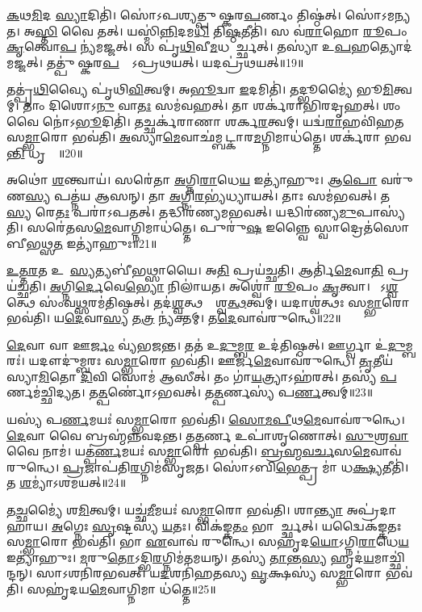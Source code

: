 \ul{𑌕}𑌥\ul{𑌮𑌿}𑌦 \ul{𑌸𑍍𑌯𑌾}𑌦𑌿𑌤𑌿॑।
𑌸𑍋॑𑌽𑌪𑌶𑍍𑌯𑌤𑍍𑌪𑍁𑌷𑍍𑌕𑌰\ul{𑌪}𑌰𑍍𑌣𑌂 𑌤𑌿𑌷𑍍𑌠॑𑌤𑍍।
𑌸𑍋॑𑌽𑌮𑌨𑍍𑌯𑌤।
𑌅\ul{𑌸𑍍𑌤𑌿} 𑌵𑍈 𑌤𑌤𑍍।
𑌯𑌸𑍍𑌮𑌿॑\ul{𑌨𑍍𑌨𑌿}𑌦𑌮\ul{𑌧𑌿} 𑌤𑌿\ul{𑌷𑍍𑌠}𑌤𑍀𑌤𑌿॑।
𑌸 𑌵॑\ul{𑌰𑌾}𑌹𑍋 \ul{𑌰𑍂}𑌪𑌂 \ul{𑌕𑍃}𑌤𑍍𑌵𑍋\ul{𑌪} 𑌨𑍍𑌯॑𑌮𑌜𑍍𑌜𑌤𑍍।
𑌸 𑌪𑍃॑\ul{𑌥𑌿}𑌵𑍀\ul{𑌮}𑌧 𑌆᳚𑌰𑍍𑌚𑍍𑌛𑌤𑍍।
𑌤𑌸𑍍𑌯𑌾॑ 𑌉\ul{𑌪}𑌹𑌤𑍍𑌯𑍋𑌦॑𑌮𑌜𑍍𑌜𑌤𑍍।
𑌤𑌤𑍍𑌪𑍁॑𑌷𑍍𑌕𑌰\ul{𑌪}𑌰𑍍𑌣𑍇᳚\-𑌽𑌪𑍍𑌰𑌥𑌯𑌤𑍍।
𑌯𑌦𑌪𑍍𑌰॑𑌥𑌯𑌤𑍍॥19॥

𑌤𑌤𑍍𑌪𑍃॑\ul{𑌥𑌿}𑌵𑍍𑌯𑍈 𑌪𑍃॑𑌥𑌿\ul{𑌵𑌿}𑌤𑍍𑌵𑌮𑍍।
𑌅\ul{𑌭𑍂}𑌦𑍍𑌵𑌾 \ul{𑌇}𑌦𑌮𑌿𑌤𑌿॑।
𑌤𑌦𑍍𑌭𑍂𑌮𑍍𑌯𑍈॑ 𑌭𑍂\ul{𑌮𑌿}𑌤𑍍𑌵𑌮𑍍।
𑌤𑌾𑌂 𑌦𑌿𑌶𑍋𑌽\ul{𑌨𑍁} 𑌵𑌾\ul{𑌤𑌃} 𑌸𑌮॑𑌵𑌹𑌤𑍍।
𑌤𑌾 𑌶𑌰𑍍𑌕॑𑌰𑌾𑌭𑌿𑌰𑌦𑍃𑌹𑌤𑍍।
𑌶𑌂 𑌵𑍈 𑌨𑍋॑𑌽\ul{𑌭𑍂}𑌦𑌿𑌤𑌿॑।
𑌤𑌚𑍍𑌛𑌰𑍍𑌕॑𑌰𑌾𑌣𑌾 𑌶𑌰𑍍𑌕\ul{𑌰}𑌤𑍍𑌵𑌮𑍍।
𑌯𑌦𑍍𑌵॑\ul{𑌰𑌾}𑌹𑌵𑌿॑𑌹𑌤 𑌸\ul{𑌮𑍍𑌭𑌾}𑌰𑍋 𑌭𑌵॑𑌤𑌿।
\ul{𑌅}𑌸𑍍𑌯𑌾\ul{𑌮𑍇}𑌵𑌾\-𑌛॑𑌮𑍍𑌬𑌟𑍍𑌕𑌾𑌰\ul{𑌮}𑌗𑍍𑌨𑌿𑌮𑌾𑌧॑𑌤𑍍𑌤𑍇।
𑌶𑌰𑍍𑌕॑𑌰𑌾 𑌭𑌵\ul{𑌨𑍍𑌤𑌿} 𑌧𑍃𑌤𑍍𑌯𑍈᳚॥20॥

𑌅𑌥𑍋॑ \ul{𑌶}𑌨𑍍𑌤𑍍𑌵𑌾𑌯॑।
𑌸𑌰𑍇॑𑌤𑌾 \ul{𑌅}𑌗𑍍𑌨𑌿\ul{𑌰𑌾}𑌧𑍇\ul{𑌯} 𑌇𑌤𑍍𑌯𑌾॑𑌹𑍁𑌃।
𑌆\ul{𑌪𑍋} 𑌵𑌰𑍁॑𑌣\ul{𑌸𑍍𑌯} 𑌪𑌤𑍍𑌨॑𑌯 𑌆𑌸𑌨𑍍।
𑌤𑌾 \ul{𑌅}𑌗𑍍𑌨𑌿\ul{𑌰}𑌭𑍍𑌯॑𑌧𑍍𑌯𑌾𑌯𑌤𑍍।
𑌤𑌾𑌃 𑌸𑌮॑𑌭𑌵𑌤𑍍।
𑌤\ul{𑌸𑍍𑌯} 𑌰𑍇\ul{𑌤𑌃} 𑌪𑌰𑌾॑𑌽𑌪𑌤𑌤𑍍।
𑌤𑌦𑍍𑌧𑌿𑌰॑𑌣𑍍𑌯𑌮𑌭𑌵𑌤𑍍।
𑌯𑌦𑍍𑌧𑌿𑌰॑𑌣𑍍𑌯\ul{𑌮𑍁}𑌪𑌾𑌸𑍍𑌯॑𑌤𑌿।
𑌸𑌰𑍇॑𑌤𑌸\ul{𑌮𑍇}𑌵𑌾𑌗𑍍𑌨𑌿𑌮𑌾𑌧॑𑌤𑍍𑌤𑍇।
𑌪𑍁𑌰𑍁॑\ul{𑌷} 𑌇𑌨𑍍𑌨𑍍𑌵𑍈 𑌸𑍍𑌵𑌾𑌦𑍍𑌰𑍇𑌤॑𑌸𑍋 𑌬𑍀𑌭𑌥𑍍𑌸\ul{𑌤} 𑌇𑌤𑍍𑌯𑌾॑𑌹𑍁𑌃॥21॥

\ul{𑌉}\ul{𑌤𑍍𑌤}\ul{𑌰}𑌤 𑌉𑌪𑌾᳚\ul{𑌸𑍍𑌯}𑌤𑍍𑌯𑌬𑍀॑𑌭𑌥𑍍𑌸𑌾𑌯𑍈।
𑌅\ul{𑌤𑌿} 𑌪𑍍𑌰𑌯॑𑌚𑍍𑌛𑌤𑌿।
𑌆𑌰𑍍𑌤𑌿॑\ul{𑌮𑍇}𑌵𑌾\ul{𑌤𑌿} 𑌪𑍍𑌰𑌯॑𑌚𑍍𑌛𑌤𑌿।
\ul{𑌅}𑌗𑍍𑌨𑌿\ul{𑌰𑍍𑌦𑍇}𑌵𑍇\ul{𑌭𑍍𑌯𑍋} 𑌨𑌿𑌲𑌾॑𑌯𑌤।
𑌅𑌶𑍍𑌵𑍋॑ \ul{𑌰𑍂}𑌪𑌂 \ul{𑌕𑍃}𑌤𑍍𑌵𑌾।
𑌸𑍋᳚𑌽\ul{𑌶𑍍𑌵}𑌤𑍍𑌥𑍇 𑌸𑌂॑𑌵\ul{𑌥𑍍𑌸}𑌰𑌮॑𑌤𑌿𑌷𑍍𑌠𑌤𑍍।
𑌤𑌦॑\ul{𑌶𑍍𑌵}𑌤𑍍𑌥𑌸𑍍𑌯𑌾᳚𑌶𑍍𑌵\ul{𑌤𑍍𑌥}𑌤𑍍𑌵𑌮𑍍।
𑌯𑌦𑌾𑌶𑍍𑌵॑𑌤𑍍𑌥𑌃 𑌸\ul{𑌮𑍍𑌭𑌾}𑌰𑍋 𑌭𑌵॑𑌤𑌿।
𑌯\ul{𑌦𑍇}𑌵𑌾\ul{𑌸𑍍𑌯} 𑌤\ul{𑌤𑍍𑌰} 𑌨𑍍𑌯॑𑌕𑍍𑌤𑌮𑍍।
𑌤\ul{𑌦𑍇}𑌵𑌾𑌵॑𑌰𑍁𑌨𑍍𑌧𑍇॥22॥

\ul{𑌦𑍇}𑌵𑌾 𑌵𑌾 𑌊\ul{𑌰𑍍𑌜𑌂} 𑌵𑍍𑌯॑𑌭𑌜𑌨𑍍𑌤।
𑌤𑌤॑ 𑌉\ul{𑌦𑍁}𑌮𑍍𑌬\ul{𑌰} 𑌉𑌦॑𑌤𑌿𑌷𑍍𑌠𑌤𑍍।
𑌊𑌰𑍍𑌗𑍍𑌵𑌾 𑌉॑\ul{𑌦𑍁}𑌮𑍍𑌬𑌰𑌃॑।
𑌯𑌦𑍗𑌦𑍁॑𑌮𑍍𑌬𑌰𑌃 𑌸\ul{𑌮𑍍𑌭𑌾}𑌰𑍋 𑌭𑌵॑𑌤𑌿।
𑌊𑌰𑍍𑌜॑\ul{𑌮𑍇}𑌵𑌾𑌵॑𑌰𑍁𑌨𑍍𑌧𑍇।
\ul{𑌤𑍃}𑌤𑍀𑌯॑𑌸𑍍𑌯𑌾\ul{𑌮𑌿}𑌤𑍋 \ul{𑌦𑌿}𑌵𑌿 𑌸𑍋𑌮॑ 𑌆𑌸𑍀𑌤𑍍।
𑌤𑌂 𑌗𑌾॑\ul{𑌯}𑌤𑍍𑌰𑍍𑌯𑌾\-𑌽𑌹॑𑌰𑌤𑍍।
𑌤𑌸𑍍𑌯॑ \ul{𑌪}𑌰𑍍𑌣𑌮॑𑌚𑍍𑌛𑌿𑌦𑍍𑌯𑌤।
𑌤\ul{𑌤𑍍𑌪}𑌰𑍍𑌣𑍋॑\-𑌽𑌭𑌵𑌤𑍍।
𑌤\ul{𑌤𑍍𑌪}𑌰𑍍𑌣𑌸𑍍𑌯॑ 𑌪\ul{𑌰𑍍𑌣}𑌤𑍍𑌵𑌮𑍍॥23॥

𑌯𑌸𑍍𑌯॑ 𑌪\ul{𑌰𑍍𑌣}𑌮𑌯𑌃॑ 𑌸\ul{𑌮𑍍𑌭𑌾}𑌰𑍋 𑌭𑌵॑𑌤𑌿।
\ul{𑌸𑍋}\ul{𑌮}\ul{𑌪𑍀}𑌥\ul{𑌮𑍇}𑌵𑌾𑌵॑𑌰𑍁𑌨𑍍𑌧𑍇।
\ul{𑌦𑍇}𑌵𑌾 𑌵𑍈 𑌬𑍍𑌰𑌹𑍍𑌮॑𑌨𑍍𑌨𑌵𑌦𑌨𑍍𑌤।
𑌤\ul{𑌤𑍍𑌪}𑌰𑍍𑌣 𑌉𑌪𑌾॑𑌶𑍃𑌣𑍋𑌤𑍍।
\ul{𑌸𑍁}𑌶𑍍𑌰\ul{𑌵𑌾} 𑌵𑍈 𑌨𑌾𑌮॑।
𑌯𑌤𑍍𑌪॑\ul{𑌰𑍍𑌣}𑌮𑌯𑌃॑ 𑌸\ul{𑌮𑍍𑌭𑌾}𑌰𑍋 𑌭𑌵॑𑌤𑌿।
\ul{𑌬𑍍𑌰}\ul{𑌹𑍍𑌮}\ul{𑌵}\ul{𑌰𑍍𑌚}𑌸\ul{𑌮𑍇}𑌵𑌾𑌵॑ 𑌰𑍁𑌨𑍍𑌧𑍇।
\ul{𑌪𑍍𑌰}𑌜𑌾𑌪॑𑌤𑌿\ul{𑌰}𑌗𑍍𑌨𑌿𑌮॑𑌸𑍃𑌜𑌤।
𑌸𑍋॑𑌽𑌬𑌿\ul{𑌭𑍇}𑌤𑍍𑌪𑍍𑌰 𑌮𑌾॑ 𑌧\ul{𑌕𑍍𑌷𑍍𑌯}𑌤𑍀𑌤𑌿॑।
𑌤 \ul{𑌶}𑌮𑍍𑌯𑌾॑\-𑌽𑌶𑌮𑌯𑌤𑍍॥24॥

𑌤\ul{𑌚𑍍𑌛}𑌮𑍍𑌯𑍈॑ 𑌶\ul{𑌮𑌿}𑌤𑍍𑌵𑌮𑍍।
𑌯𑌚𑍍𑌛॑\ul{𑌮𑍀}𑌮𑌯𑌃॑ 𑌸\ul{𑌮𑍍𑌭𑌾}𑌰𑍋 𑌭𑌵॑𑌤𑌿।
𑌶𑌾\ul{𑌨𑍍𑌤𑍍𑌯𑌾} 𑌅𑌪𑍍𑌰॑𑌦𑌾𑌹𑌾𑌯।
\ul{𑌅}𑌗𑍍𑌨𑍇𑌃 \ul{𑌸𑍃}𑌷𑍍𑌟𑌸𑍍𑌯॑ \ul{𑌯}𑌤𑌃।
𑌵𑌿𑌕॑𑌙𑍍𑌕\ul{𑌤𑌂} 𑌭𑌾 𑌆᳚𑌰𑍍𑌚𑍍𑌛𑌤𑍍।
𑌯𑌦𑍍𑌵𑍈𑌕॑𑌙𑍍𑌕𑌤𑌃 𑌸\ul{𑌮𑍍𑌭𑌾}𑌰𑍋 𑌭𑌵॑𑌤𑌿।
𑌭𑌾 \ul{𑌏}𑌵𑌾𑌵॑ 𑌰𑍁𑌨𑍍𑌧𑍇।
𑌸𑌹𑍃॑𑌦\ul{𑌯𑍋}\-𑌽𑌗𑍍𑌨𑌿\ul{𑌰𑌾}𑌧𑍇\ul{𑌯} 𑌇𑌤𑍍𑌯𑌾॑𑌹𑍁𑌃।
\ul{𑌮}𑌰𑍁\ul{𑌤𑍋}\-𑌽𑌦𑍍𑌭𑌿\ul{𑌰}𑌗𑍍𑌨𑌿𑌮॑𑌤𑌮𑌯𑌨𑍍।
𑌤𑌸𑍍𑌯॑ \ul{𑌤𑌾}𑌨𑍍𑌤\ul{𑌸𑍍𑌯} 𑌹𑍃𑌦॑\ul{𑌯}𑌮𑌾𑌚𑍍𑌛𑌿॑𑌨𑍍𑌦𑌨𑍍।
𑌸𑌾𑌽𑌶𑌨𑌿॑𑌰𑌭𑌵𑌤𑍍।
𑌯\ul{𑌦}𑌶𑌨𑌿॑𑌹𑌤𑌸𑍍𑌯 \ul{𑌵𑍃}𑌕𑍍𑌷𑌸𑍍𑌯॑ 𑌸\ul{𑌮𑍍𑌭𑌾}𑌰𑍋 𑌭𑌵॑𑌤𑌿।
𑌸𑌹𑍃॑𑌦𑌯\ul{𑌮𑍇}𑌵𑌾𑌗𑍍𑌨𑌿𑌮𑌾 𑌧॑𑌤𑍍𑌤𑍇॥25॥

